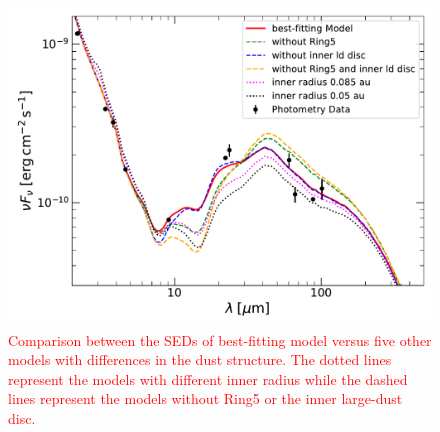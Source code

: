 \documentclass[fleqn,usenatbib,useAMS]{mnras}
\newcommand{\red}[1]{\textcolor{red}{#1}}
\begin{document}
\begin{figure}
	\includegraphics[width=\columnwidth]{SED_three_model_comparision.pdf}
        \caption{\red{Comparison between the SEDs of best-fitting model versus five other models with differences in the dust structure. The dotted lines represent the models with different inner radius while the dashed lines represent the models without Ring5 or the inner large-dust disc.}}
    \label{fig:SED_comparition}

\end{figure}

	



\bsp	%
\label{lastpage}
\end{document}
